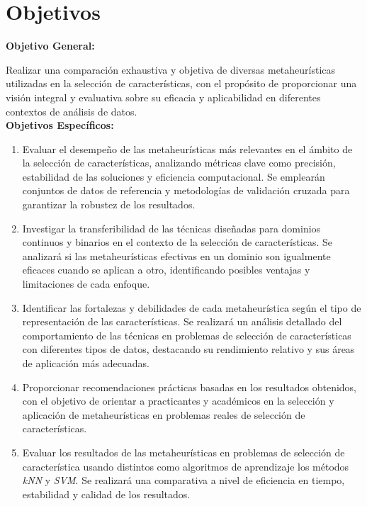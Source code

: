 \section{Objetivos}
\textbf{Objetivo General:}

Realizar una comparación exhaustiva y objetiva de diversas metaheurísticas utilizadas en la
selección de características, con el propósito de proporcionar una visión integral y
evaluativa sobre su eficacia y aplicabilidad en diferentes contextos de análisis de
datos.\\[6pt]
\textbf{Objetivos Específicos:}

\begin{enumerate}
      \item Evaluar el desempeño de las metaheurísticas más relevantes en el ámbito de la
            selección de características, analizando métricas clave como precisión, estabilidad de
            las soluciones y eficiencia computacional. Se emplearán conjuntos de datos de referencia
            y metodologías de validación cruzada para garantizar la robustez de los resultados.

      \item Investigar la transferibilidad de las técnicas diseñadas para dominios continuos y
            binarios en el contexto de la selección de características. Se analizará si las
            metaheurísticas efectivas en un dominio son igualmente eficaces cuando se aplican a
            otro, identificando posibles ventajas y limitaciones de cada enfoque.

      \item Identificar las fortalezas y debilidades de cada metaheurística según el tipo de
            representación de las características. Se realizará un análisis detallado del
            comportamiento de las técnicas en problemas de selección de características con
            diferentes tipos de datos, destacando su rendimiento relativo y sus áreas de aplicación
            más adecuadas.

      \item Proporcionar recomendaciones prácticas basadas en los resultados obtenidos, con el
            objetivo de orientar a practicantes y académicos en la selección y aplicación de
            metaheurísticas en problemas reales de selección de características.

      \item Evaluar los resultados de las metaheurísticas en problemas de selección de característica
            usando distintos como algoritmos de aprendizaje los métodos \textit{kNN} y \textit{SVM}. Se realizará
            una comparativa a nivel de eficiencia en tiempo, estabilidad y calidad de los resultados.
\end{enumerate}
